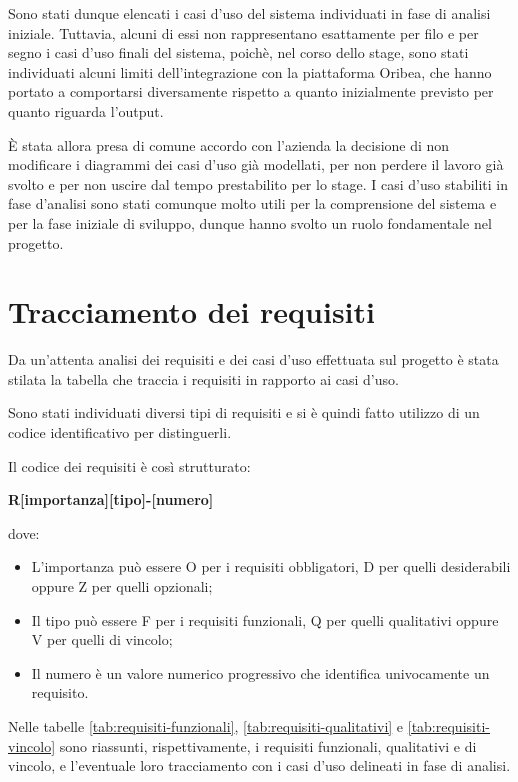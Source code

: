 \vspace{2cm}


Sono stati dunque elencati i casi d'uso del sistema individuati in fase di analisi iniziale. Tuttavia, alcuni di essi non rappresentano esattamente per filo e per segno i casi d'uso finali del sistema, poichè, nel corso dello stage, sono stati individuati alcuni limiti dell'integrazione con la piattaforma Oribea, che hanno portato a comportarsi diversamente rispetto a quanto inizialmente previsto per quanto riguarda l'output.

È stata allora presa di comune accordo con l'azienda la decisione di non modificare i diagrammi dei casi d'uso già modellati, per non perdere il lavoro già svolto e per non uscire dal tempo prestabilito per lo stage. I casi d'uso stabiliti in fase d'analisi sono stati comunque molto utili per la comprensione del sistema e per la fase iniziale di sviluppo, dunque hanno svolto un ruolo fondamentale nel progetto.


\newpage









\section{Tracciamento dei requisiti}

Da un'attenta analisi dei requisiti e dei casi d'uso effettuata sul progetto è stata stilata la tabella che traccia i requisiti in rapporto ai casi d'uso.

Sono stati individuati diversi tipi di requisiti e si è quindi fatto utilizzo di un codice identificativo per distinguerli.

Il codice dei requisiti è così strutturato:
\begin{center}
    \textbf{R[importanza][tipo]-[numero]}
\end{center}
dove:
\begin{itemize}
	\item L'importanza può essere O per i requisiti obbligatori, D per quelli desiderabili oppure Z per quelli opzionali;
	\item Il tipo può essere F per i requisiti funzionali, Q per quelli qualitativi oppure V per quelli di vincolo;
	\item Il numero è un valore numerico progressivo che identifica univocamente un requisito.
\end{itemize}
Nelle tabelle \ref{tab:requisiti-funzionali}, \ref{tab:requisiti-qualitativi} e \ref{tab:requisiti-vincolo} sono riassunti, rispettivamente, i requisiti funzionali, qualitativi e di vincolo, e l’eventuale loro tracciamento con i casi d'uso delineati in fase di analisi.


